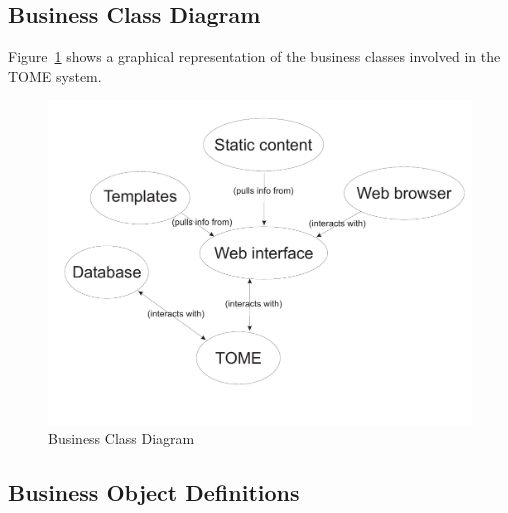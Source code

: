 \documentclass[12pt,titlepage]{article}
\begin{document}
\subsection{Business Class Diagram}
Figure~\ref{BusinessModelDiagram} shows a graphical representation of the business classes involved in the TOME system.
\begin{figure}[h]
	\includegraphics[width=\textwidth]{BusinessModelDiagram}
	\caption{Business Class Diagram}
	\label{BusinessModelDiagram}
\end{figure}
\newpage
\subsection{Business Object Definitions}
\end{document}
